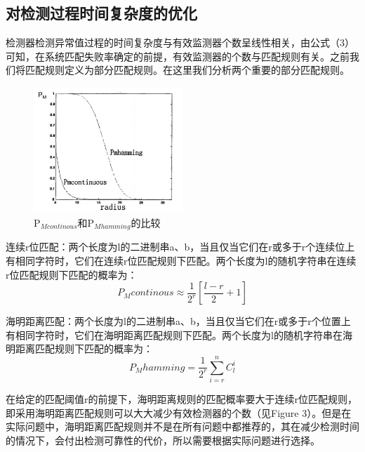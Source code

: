 \documentclass[preprint,12pt,3p]{elsarticle}
\begin{document}
\subsection{对检测过程时间复杂度的优化}
\label{subsec2}
检测器检测异常值过程的时间复杂度与有效监测器个数呈线性相关，由公式（3）可知，在系统匹配失败率确定的前提，有效监测器的个数与匹配规则有关。之前我们将匹配规则定义为部分匹配规则。在这里我们分析两个重要的部分匹配规则。
\begin{figure}[hb]
  \centering
  \includegraphics[width=0.5\textwidth]{img/CompareCH.jpg}
  \caption{P$_{Mcontinous}$和P$_{Mhamming}$的比较}
\end{figure}

\par
连续r位匹配：两个长度为l的二进制串a、b，当且仅当它们在r或多于r个连续位上有相同字符时，它们在连续r位匹配规则下匹配。两个长度为l的随机字符串在连续r位匹配规则下匹配的概率为：
\begin{equation}
   P_Mcontinous \approx \frac{1}{2^r}[\frac{l-r}{2}+1]
\end{equation}
\par
海明距离匹配：两个长度为l的二进制串a、b，当且仅当它们在r或多于r个位置上有相同字符时，它们在海明距离匹配规则下匹配。两个长度为l的随机字符串在海明距离匹配规则下匹配的概率为：
\begin{equation}
   P_Mhamming = \frac{1}{2^r}\sum_{i=r}^{n}C_l^i
\end{equation}

\par
在给定的匹配阈值r的前提下，海明距离规则的匹配概率要大于连续r位匹配规则，即采用海明距离匹配规则可以大大减少有效检测器的个数（见Figure 3）。但是在实际问题中，海明距离匹配规则并不是在所有问题中都推荐的，其在减少检测时间的情况下，会付出检测可靠性的代价，所以需要根据实际问题进行选择。
\end{document}
